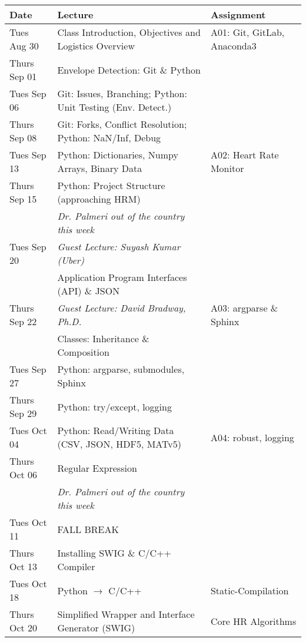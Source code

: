 \begin{longtable}[c]{|l|l|l|}

    \hline 
    
    \textbf{Date} & \textbf{Lecture} & \textbf{Assignment}\\

    \hline

    Tues Aug 30     & Class Introduction, Objectives and Logistics Overview & A01: Git, GitLab, Anaconda3 \\
    Thurs Sep 01    & Envelope Detection: Git \& Python & \\
    \hline
    Tues Sep 06     & Git: Issues, Branching; Python: Unit Testing (Env. Detect.)& \\
    Thurs Sep 08    & Git: Forks, Conflict Resolution; Python: NaN/Inf, Debug & \\
    \hline
    Tues Sep 13     & Python: Dictionaries, Numpy Arrays, Binary Data & A02: Heart Rate Monitor \\
    Thurs Sep 15    & Python: Project Structure (approaching HRM) & \\
    \hline
                    & \emph{Dr. Palmeri out of the country this week} & \\
    Tues Sep 20     & \emph{Guest Lecture: Suyash Kumar (Uber)} & \\
                    & Application Program Interfaces (API) \& JSON & \\
    Thurs Sep 22    & \emph{Guest Lecture: David Bradway, Ph.D.} & A03: argparse \& Sphinx\\
                    & Classes: Inheritance \& Composition & \\
    \hline
    Tues Sep 27     & Python: argparse, submodules, Sphinx & \\
    Thurs Sep 29    & Python: try/except, logging & \\
    \hline
    Tues Oct 04     & Python: Read/Writing Data (CSV, JSON, HDF5, MATv5) & A04: robust, logging \\
    Thurs Oct 06    & Regular Expression & \\
    \hline
                    & \emph{Dr. Palmeri out of the country this week} & \\
    Tues Oct 11     & FALL BREAK & \\
    Thurs Oct 13    & Installing SWIG \& C/C++ Compiler & \\
    \hline
    Tues Oct 18     & Python $\rightarrow$ C/C++ & Static-Compilation \\
    Thurs Oct 20    & Simplified Wrapper and Interface Generator (SWIG) & Core HR Algorithms \\

\end{longtable}
